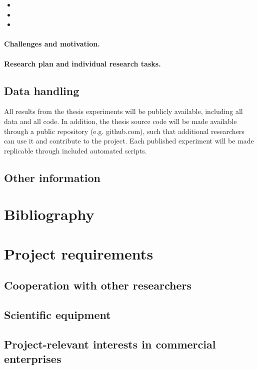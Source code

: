 \documentclass[11pt]{article}
\begin{document}
\label{wp:something}

\begin{itemize}
\item 
\item 
\item 
\end{itemize}

\paragraph{Challenges and motivation.}


\paragraph{Research plan and individual research tasks.}

\label{task-wp1-2}

\label{wp:work-something}

\label{wp:do-this}



\let\thesubsection=\oldthesubsection
\let\thesubsubsection=\oldthesubsubsection
\setcounter{subsection}{3}

\subsection{Data handling}

All results from the thesis experiments will be publicly available, including all data and all code.
In addition, the thesis source code will be made available through a public repository (e.g.
github.com), such that additional researchers can use it and contribute to the project. Each
published experiment will be made replicable through included automated scripts.

\subsection{Other information}

\section{Bibliography}




\section{Project requirements}
\subsection{Cooperation with other researchers}
\subsection{Scientific equipment}

\subsection{Project-relevant interests in commercial enterprises}
\end{document}
